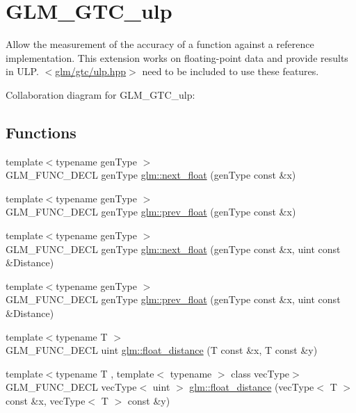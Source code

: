 \hypertarget{group__gtc__ulp}{\section{G\-L\-M\-\_\-\-G\-T\-C\-\_\-ulp}
\label{group__gtc__ulp}
}


Allow the measurement of the accuracy of a function against a reference implementation. This extension works on floating-\/point data and provide results in U\-L\-P. $<$\hyperlink{ulp_8hpp}{glm/gtc/ulp.\-hpp}$>$ need to be included to use these features.  


Collaboration diagram for G\-L\-M\-\_\-\-G\-T\-C\-\_\-ulp\-:
\subsection*{Functions}
\begin{DoxyCompactItemize}
\item 
{\footnotesize template$<$typename gen\-Type $>$ }\\G\-L\-M\-\_\-\-F\-U\-N\-C\-\_\-\-D\-E\-C\-L gen\-Type \hyperlink{group__gtc__ulp_gae516ae554faa6117660828240e8bdaf0}{glm\-::next\-\_\-float} (gen\-Type const \&x)
\item 
{\footnotesize template$<$typename gen\-Type $>$ }\\G\-L\-M\-\_\-\-F\-U\-N\-C\-\_\-\-D\-E\-C\-L gen\-Type \hyperlink{group__gtc__ulp_ga2fcbb7bfbfc595712bfddc51b0715b07}{glm\-::prev\-\_\-float} (gen\-Type const \&x)
\item 
{\footnotesize template$<$typename gen\-Type $>$ }\\G\-L\-M\-\_\-\-F\-U\-N\-C\-\_\-\-D\-E\-C\-L gen\-Type \hyperlink{group__gtc__ulp_gad107ec3d9697ef82032a33338a73ebdd}{glm\-::next\-\_\-float} (gen\-Type const \&x, uint const \&Distance)
\item 
{\footnotesize template$<$typename gen\-Type $>$ }\\G\-L\-M\-\_\-\-F\-U\-N\-C\-\_\-\-D\-E\-C\-L gen\-Type \hyperlink{group__gtc__ulp_gaa399d5b6472a70e8952f9b26ecaacdec}{glm\-::prev\-\_\-float} (gen\-Type const \&x, uint const \&Distance)
\item 
{\footnotesize template$<$typename T $>$ }\\G\-L\-M\-\_\-\-F\-U\-N\-C\-\_\-\-D\-E\-C\-L uint \hyperlink{group__gtc__ulp_ga2e09bd6c8b0a9c91f6f5683d68245634}{glm\-::float\-\_\-distance} (T const \&x, T const \&y)
\item 
{\footnotesize template$<$typename T , template$<$ typename $>$ class vec\-Type$>$ }\\G\-L\-M\-\_\-\-F\-U\-N\-C\-\_\-\-D\-E\-C\-L vec\-Type$<$ uint $>$ \hyperlink{group__gtc__ulp_ga85355f2549d75789eb66e5d565d8ad26}{glm\-::float\-\_\-distance} (vec\-Type$<$ T $>$ const \&x, vec\-Type$<$ T $>$ const \&y)
\end{DoxyCompactItemize}


